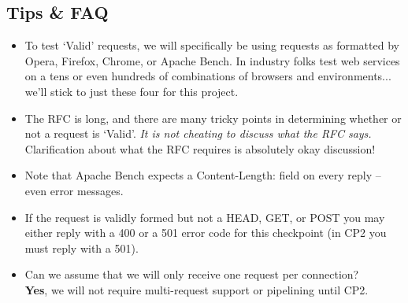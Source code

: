 \subsection{Tips \& FAQ}
    \begin{itemize}
      \item To test `Valid' requests, we will specifically be using requests as formatted by Opera, Firefox, Chrome, or Apache Bench. In industry folks test web services on a tens or even hundreds of combinations of browsers and environments... we'll stick to just these four for this project.
    
      \item The RFC is long, and there are many tricky points in determining whether or not a request is `Valid'. {\it It is not cheating to discuss what the RFC says.} Clarification about what the RFC requires is absolutely okay discussion!  

      \item Note that Apache Bench expects a Content-Length: field on every reply -- even error messages.
      \item If the request is validly formed but not a HEAD, GET, or POST you may either reply with a 400 or a 501 error code for this checkpoint (in CP2 you must reply with a 501).
  
      \item Can we assume that we will only receive one request per connection?\\
        {\bf Yes}, we will not require multi-request support or pipelining until CP2.
    \end{itemize}

\newpage

